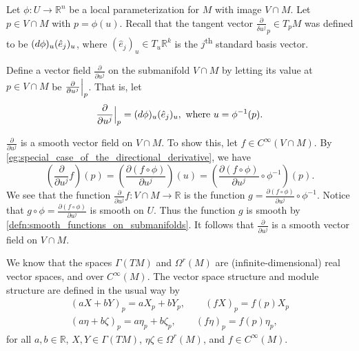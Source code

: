 \documentclass[notoc,notitlepage]{tufte-book}
\begin{document}
\begin{eg}[\imponote]\label{eg:important_eg_for_smoothness_on_submanifolds}
  Let $\phi : U \to \mathbb{R}^n$ be a local parameterization for $M$ with image
  $V \cap M$. Let $p \in V \cap M$ with $p = \phi(u)$. Recall that the tangent
  vector $\frac{\partial}{\delta u^j}_p \in T_p M$ was defined to be
  $(\mathop{}\!d{\phi})_u(\hat{e}_j)_u$, where $(\hat{e}_j)_u \in T_u \mathbb{R}^k$ is
  the $j$\textsuperscript{th} standard basis vector.

  Define a vector field $\frac{\partial}{\partial u^j}$ on the submanifold $V
  \cap M$ by letting its value at $p \in V \cap M$ be $\frac{\partial}{\partial
  u^j}\Big|_{p}^{}$. That is, let
  \begin{equation*}
    \frac{\partial}{\partial u^j}\Big|_{p}^{} = (\mathop{}\!d{\phi})_u (\hat{e}_j)_u,
    \text{ where } u = \phi^{-1}(p).
  \end{equation*}

   $\frac{\partial}{\partial u^j}$ is a smooth vector field on
  $V \cap M$. To show this, let $f \in C^\infty(V \cap M)$. By
  \cref{eg:special_case_of_the_directional_derivative}, we have
  \begin{equation*}
    \left( \frac{\partial}{\partial u^j} f \right)(p)
    = \left( \frac{\partial(f \circ \phi)}{\partial u^j} \right)(u)
    = \left( \frac{\partial(f \circ \phi)}{\partial u^j} \circ \phi^{-1}
    \right)(p).
  \end{equation*}
  We see that the function $\frac{\partial}{\partial u^j} f : V \cap M \to
  \mathbb{R}$ is the function $g = \frac{\partial(f\circ\phi)}{\partial u^j}
  \circ \phi^{-1}$. Notice that $g \circ \phi =
  \frac{\partial(f\circ\phi)}{\partial u^j}$ is smooth on $U$. Thus the function
  $g$ is smooth by \cref{defn:smooth_functions_on_submanifolds}. It follows that
  $\frac{\partial}{\partial u^j}$ is a smooth vector field on $V \cap M$.
\end{eg}

\begin{propo}\label{propo:structures_of_gamma_tm_and_omega_r_m_}
  We know that the spaces $\Gamma(TM)$ and $\Omega^r(M)$ are
  (infinite-dimensional) real vector spaces, and  over
  $C^\infty(M)$. The vector space structure and module structure are defined in
  the usual way by
  \begin{gather*}
    (aX + bY)_p = aX_p + bY_p, \qquad (fX)_p = f(p)X_p \\
    (a\eta + b\zeta)_p = a\eta_p + b\zeta_p, \qquad (f\eta)_p = f(p)\eta_p,
  \end{gather*} 
  for all $a, b \in \mathbb{R}$, $X, Y \in \Gamma(TM)$, $\eta \zeta \in
  \Omega^r(M)$, and $f \in C^\infty(M)$.
\end{propo}
\end{document}
